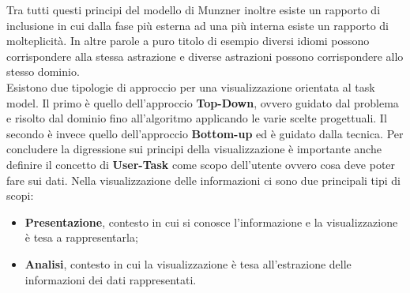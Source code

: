 {Tra tutti questi principi del modello di Munzner inoltre esiste un rapporto di inclusione in cui dalla fase più esterna ad una più interna esiste un rapporto di molteplicità.
In altre parole a puro titolo di esempio diversi idiomi possono corrispondere alla stessa astrazione e diverse astrazioni possono corrispondere allo stesso dominio.\\
Esistono due tipologie di approccio per una visualizzazione orientata al task model. Il primo è quello dell'approccio \textbf{Top-Down}, ovvero guidato dal problema e risolto dal dominio fino all'algoritmo applicando le varie scelte progettuali. Il secondo è invece quello dell'approccio \textbf{Bottom-up} ed è guidato dalla tecnica.
Per concludere la digressione sui principi della visualizzazione è importante anche definire il concetto di \textbf{User-Task} come scopo dell'utente ovvero cosa deve poter fare sui dati.
Nella visualizzazione delle informazioni ci sono due principali tipi di scopi:
\begin{itemize}
	\item \textbf{Presentazione}, contesto in cui si conosce l'informazione e la visualizzazione è tesa a rappresentarla;
	\item \textbf{Analisi}, contesto in cui la visualizzazione è tesa all'estrazione delle informazioni dei dati rappresentati.
\end{itemize}

}
